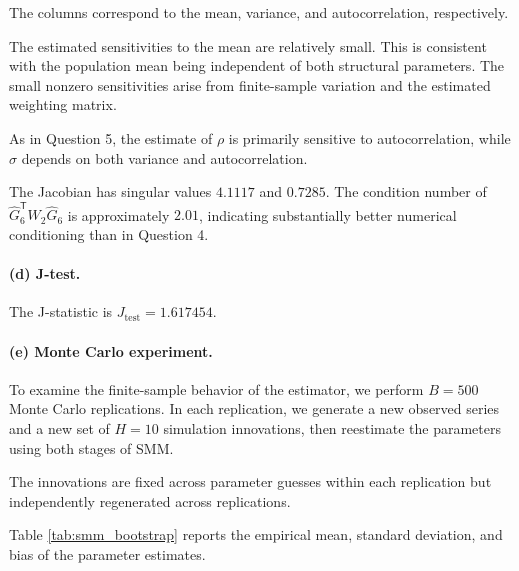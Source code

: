 \documentclass{article}
\begin{document}
The columns correspond to the mean, variance, and
autocorrelation, respectively.

The estimated sensitivities to the mean are relatively small.
This is consistent with the population mean being independent
of both structural parameters. The small nonzero sensitivities
arise from finite-sample variation and the estimated weighting
matrix.

As in Question 5, the estimate of $\rho$ is primarily sensitive
to autocorrelation, while $\sigma$ depends on both variance
and autocorrelation.

The Jacobian has singular values $4.1117$ and $0.7285$.
The condition number of
$\widehat G_6^{\mathsf T}W_2\widehat G_6$
is approximately $2.01$, indicating substantially better
numerical conditioning than in Question 4.

\paragraph{(d) J-test.}

The J-statistic is $J_{\mathrm{test}}=1.617454.$

\paragraph{(e) Monte Carlo experiment.}

To examine the finite-sample behavior of the estimator,
we perform $B=500$ Monte Carlo replications. In each
replication, we generate a new observed series and a new
set of $H=10$ simulation innovations, then reestimate the
parameters using both stages of SMM.

The innovations are fixed across parameter guesses within
each replication but independently regenerated across
replications.

Table \ref{tab:smm_bootstrap} reports the empirical mean,
standard deviation, and bias of the parameter estimates.
\end{document}
